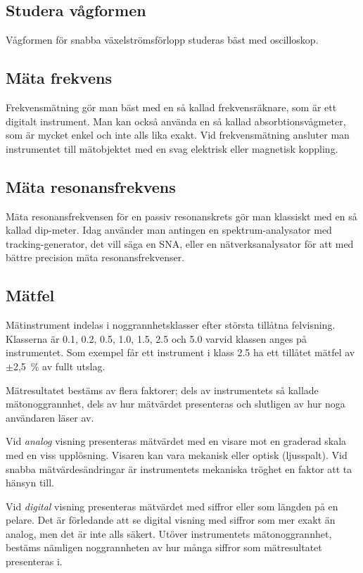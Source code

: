 \subsection{Studera vågformen}

Vågformen för snabba växelströmsförlopp studeras bäst med oscilloskop.

\subsection{Mäta frekvens}

Frekvensmätning gör man bäst med en så kallad frekvensräknare, som är ett
digitalt instrument.
Man kan också använda en så kallad absorbtionsvågmeter, som är mycket enkel och
inte alls lika exakt.
Vid frekvensmätning ansluter man instrumentet till mätobjektet med en
svag elektrisk eller magnetisk koppling.

\subsection{Mäta resonansfrekvens}

Mäta resonansfrekvensen för en passiv resonanskrets gör man klassiskt
med en så kallad dip-meter.
Idag använder man antingen en spektrum-analysator med tracking-generator,
det vill säga en SNA, eller en nätverksanalysator för att med bättre precision
mäta resonansfrekvenser.

\subsection{Mätfel}

Mätinstrument indelas i noggrannhetsklasser efter största tillåtna felvisning.
Klasserna är 0.1, 0.2, 0.5, 1.0, 1.5, 2.5 och 5.0 varvid klassen anges på
instrumentet.
Som exempel får ett instrument i klass 2.5 ha ett tillåtet mätfel av
\(\pm\)2,5~\% av fullt utslag.

Mätresultatet bestäms av flera faktorer; dels av instrumentets
så kallade mätonoggrannhet, dels av hur mätvärdet presenteras och slutligen
av hur noga användaren läser av.

Vid \emph{analog} visning presenteras mätvärdet med en visare mot en
graderad skala med en viss upplösning.
Visaren kan vara mekanisk eller optisk (ljusspalt).
Vid snabba mätvärdesändringar är instrumentets mekaniska tröghet en faktor
att ta hänsyn till.

Vid \emph{digital} visning presenteras mätvärdet med siffror eller som
längden på en pelare.
Det är förledande att se digital visning med siffror som mer exakt än analog,
men det är inte alls säkert.
Utöver instrumentets mätonoggrannhet, bestäms nämligen noggrannheten av hur
många siffror som mätresultatet presenteras i.

